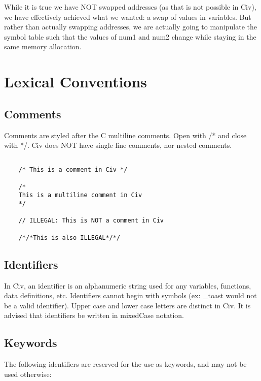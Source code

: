 \documentclass[a4paper]{article}
\begin{document}
While it is true we have NOT swapped addresses (as that is not possible in Civ), we have effectively achieved what we wanted: a swap of values in variables. But rather than actually swapping addresses, we are actually going to manipulate the symbol table such that the values of num1 and num2 change while staying in the same memory allocation.

\section{Lexical Conventions}

\subsection{Comments}

Comments are styled after the C multiline comments. Open with /* and close with */. Civ does NOT have single line comments, nor nested comments.

{\selectfont
\begin{lstlisting}
   
	/* This is a comment in Civ */
  
	/*
	This is a multiline comment in Civ
	*/
    
	// ILLEGAL: This is NOT a comment in Civ
   
	/*/*This is also ILLEGAL*/*/
\end{lstlisting}
}

\subsection{Identifiers}

In Civ, an identifier is an alphanumeric string used for any variables, functions, data definitions, etc. Identifiers cannot begin with symbols (ex: \_toast would not be a valid identifier). Upper case and lower case letters are distinct in Civ. It is advised that identifiers be written in mixedCase notation.

\subsection{Keywords}

The following identifiers are reserved for the use as keywords, and may not be used otherwise:
\end{document}
